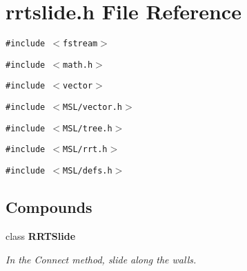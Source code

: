 \section{rrtslide.h File Reference}
\label{rrtslide_8h}
{\tt \#include $<$fstream$>$}\par
{\tt \#include $<$math.h$>$}\par
{\tt \#include $<$vector$>$}\par
{\tt \#include $<$MSL/vector.h$>$}\par
{\tt \#include $<$MSL/tree.h$>$}\par
{\tt \#include $<$MSL/rrt.h$>$}\par
{\tt \#include $<$MSL/defs.h$>$}\par
\subsection*{Compounds}
\begin{CompactItemize}
\item 
class {\bf RRTSlide}
\begin{CompactList}\small\item\em In the Connect method, slide along the walls.\item\end{CompactList}\end{CompactItemize}
